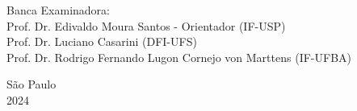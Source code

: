 \begin{titlepage}

\noindent Banca Examinadora: \\
\noindent Prof. Dr. Edivaldo Moura Santos - Orientador (IF-USP) \\
Prof. Dr. Luciano Casarini (DFI-UFS) \\
Prof. Dr. Rodrigo Fernando Lugon Cornejo von Marttens (IF-UFBA) \\
\vspace{2.8cm}


\centering
    {São Paulo \\  2024}
\clearpage
\end{titlepage}

